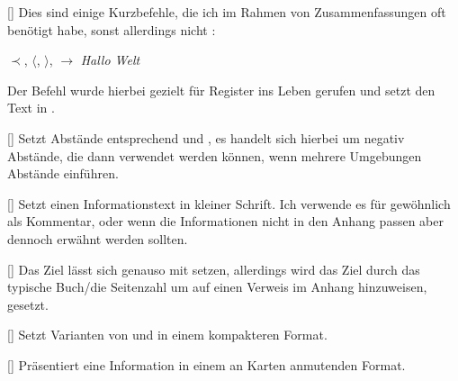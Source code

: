 [\cmdlist\anothercmd[1.0.2]{<}\cmdlist\anothercmd[1.0.2]{>}\cmdlist{}\cmdlist{}]
Dies sind einige Kurzbefehle, die ich im Rahmen von Zusammenfassungen oft benötigt habe, sonst allerdings nicht \Smiley:
{
    \def\imp{\ensuremath{\prec}}
    \def\<{\ensuremath{\langle}}
    \def\>{\ensuremath{\rangle}}
    \def\mto{\ensuremath{\to}}
    \def\reg#1{\T{#1}}
    \def\customex#1{\begingroup\scriptsize\textit{#1}\normalsize\endgroup}
    \begin{latex}[alsoletter={\\\#@_*<>}]
\imp, \<, \>, \mto %
\reg{Hallo Welt}   %
\customex{Hallo Welt}   %
    \end{latex}
}
Der Befehl  wurde hierbei gezielt für Register ins Leben gerufen und setzt den Text in .

%
%
%

[\cmdlist{}\cmdlist{}]
Setzt Abstände entsprechend  und , es handelt sich hierbei um negativ Abstände, die dann verwendet werden können, wenn mehrere Umgebungen Abstände einführen.

%
%
%

[]
Setzt einen Informationstext in kleiner Schrift. Ich verwende es für gewöhnlich als Kommentar, oder wenn die Informationen nicht in den Anhang passen aber dennoch erwähnt werden sollten.

%
%
%

[]
Das Ziel lässt sich genauso mit  setzen, allerdings wird das Ziel durch das typische Buch/die Seitenzahl um auf einen Verweis im Anhang hinzuweisen, gesetzt.

%
%
%

[\cmdlist{}]
Setzt Varianten von  und  in einem kompakteren Format.

%
%
%

[]
Präsentiert eine Information in einem an Karten anmutenden Format.

